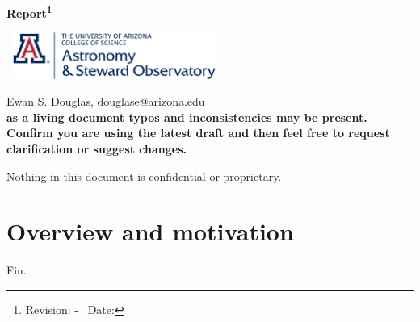 \documentclass[12pt]{book}
\begin{document}
\begin{titlepage}
\begin{center}

\vspace*{\fill}
{\large \bfseries Report\footnote{{ Revision: \gitAbbrevHash - \gitDirty\ Date: \gitCommitterDate}}}
\vspace*{20cm}
\end{center}


\end{titlepage}
\newpage
\begin{center}

\vspace{7cm }
\
\includegraphics[width=0.5\textwidth]{images/steward_logo.png}
\vspace{2cm }

Ewan S. Douglas, douglase@arizona.edu\\

\textbf{as a living document typos and inconsistencies may be present. Confirm you are using the latest draft and then feel free to request clarification or suggest changes.}

Nothing in this document is confidential or proprietary.


\end{center}


\tableofcontents

\linenumbers

\chapter{Overview and motivation}
\printglossary[type=main,nonumberlist]


\sloppy %



Fin.
\end{document}
